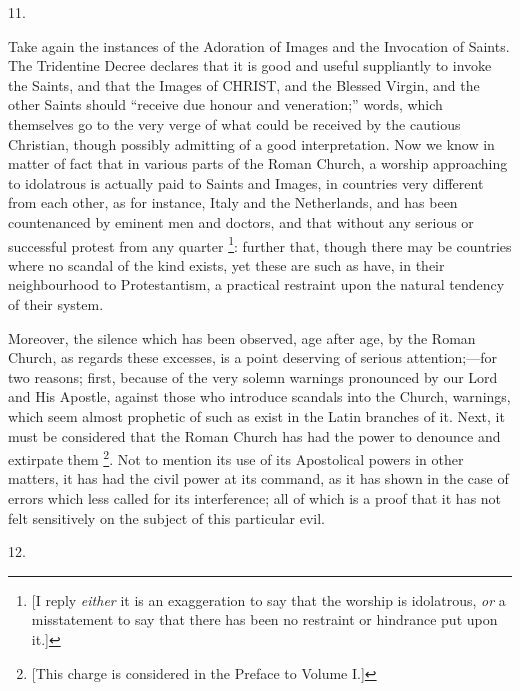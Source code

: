 11.

Take again the instances of the Adoration of
Images and the Invocation of Saints. The Tridentine Decree declares
that it is good and useful suppliantly to invoke the Saints, and that
the Images of CHRIST, and
the Blessed Virgin, and the other Saints should ``receive due honour
and veneration;'' words, which themselves go to the very verge of what
could be received by the cautious Christian, though possibly admitting
of a good interpretation. Now we know in matter of fact that in
various parts of the Roman Church, a worship approaching to idolatrous
is actually paid to Saints and Images, in countries very different
from each other, as for instance, Italy and the Netherlands, and
has been countenanced by eminent men and doctors, and that without any
serious or successful protest from any quarter \footnote{[I reply \emph{either} it is an exaggeration to say that the worship
is idolatrous, \emph{or} a misstatement to say that there has been no
restraint or hindrance put upon it.]}: further that, though there may be countries where no scandal
of the kind exists, yet these are such as have, in their neighbourhood
to Protestantism, a practical restraint upon the natural tendency of
their system.

Moreover, the silence which has been observed,
age after age, by the Roman Church, as regards these excesses, is a
point deserving of serious attention;—for two reasons; first,
because of the very solemn warnings pronounced by our Lord and His
Apostle, against those who introduce scandals into the Church,
warnings, which seem almost prophetic of such as exist in the Latin
branches of it. Next, it must be considered that the Roman Church has
had the power to denounce and extirpate them \footnote{[This charge is considered in the Preface to Volume I.]}. Not to mention its use of its Apostolical powers in other
matters, it has had the civil power at its command, as it has shown in
the case of errors which less called for its interference; all of
which is a proof that it has not felt sensitively on the subject of
this particular evil.

12.

